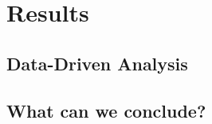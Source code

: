 \section{Results}
\label{sec:results}
\subsection{Data-Driven Analysis}


\subsection{What can we conclude?}

